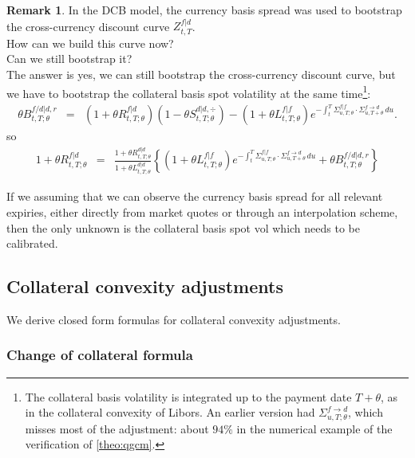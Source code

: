 \documentclass[11pt,english]{amsart}
\theoremstyle{definition}
\newtheorem{rema}{Remark}
\begin{document}
\begin{rema}
In the DCB model, the currency basis spread was used to bootstrap the cross-currency discount curve $Z^{f|d}_{t,T}$. \\
How can we build this curve now? \\
Can we still bootstrap it? \\
The answer is yes, we can still bootstrap the cross-currency discount curve, but we have to bootstrap the collateral basis spot volatility at the same time\footnote{The collateral basis volatility is integrated up to the payment date $T+\theta$, as in the collateral convexity of Libors. An earlier version had $\Sigma^{f\to d}_{u,T;\theta}$, which misses most of the adjustment: about $94\%$ in the numerical example of the verification of \autoref{theo:qgcm}.}:
\begin{eqnarray}\label{eq:xccy_swaplet_master_equation}
  \theta B^{f/d|d,r}_{t,T;\theta} 
  &=& (1+\theta R^{f|d}_{t,T;\theta})(1 - \theta S^{d|d,\div}_{t,T;\theta})   
  - (1+\theta L^{f|f}_{t,T;\theta}) e^{-\int_t^T \Sigma^{f|f}_{u,T;\theta} \cdot \Sigma^{f\to d}_{u,T+\theta}\, du}. 
\end{eqnarray} 
so 
\begin{eqnarray}
  1+\theta R^{f|d}_{t,T;\theta} 
  &=& \frac{1+\theta R^{d|d}_{t,T;\theta}}{1+\theta L^{d|d}_{t,T;\theta}}  \left\{    
  (1+\theta L^{f|f}_{t,T;\theta}) e^{-\int_t^T \Sigma^{f|f}_{u,T;\theta} \cdot \Sigma^{f\to d}_{u,T+\theta} \, du} + \theta B^{f/d|d,r}_{t,T;\theta} 
  \right\}
\end{eqnarray} 

If we assuming that we can observe the currency basis spread for all relevant expiries, either directly from market quotes or through an interpolation scheme, then the only unknown is the collateral basis spot vol which needs to be calibrated.
\end{rema}



\newpage%
\subsection{Collateral convexity adjustments}%
We derive closed form formulas for collateral convexity adjustments. 
 
\subsubsection{Change of collateral formula}%
 
\end{document}
